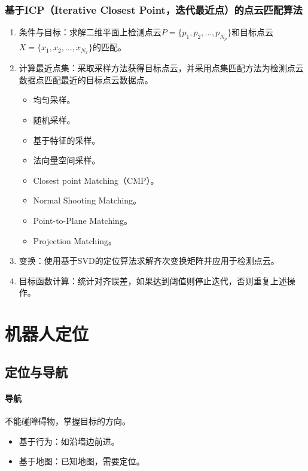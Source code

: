 \documentclass[
12pt, %
a4paper, 
oneside, %
headinclude,footinclude, %
]{scrartcl}
\begin{document}
\subsubsection[基于ICP的点云匹配算法]{基于ICP（Iterative Closest Point，迭代最近点）的点云匹配算法}
\begin{enumerate}
\item 条件与目标：求解二维平面上检测点云$ P = \{p_1, p_2, \dots, p_{N_p}\} $和目标点云$ X = \{x_1, x_2, \dots, x_{N_x}\} $的匹配。
\item 计算最近点集：采取采样方法获得目标点云，并采用点集匹配方法为检测点云数据点匹配最近的目标点云数据点。

\begin{minipage}{0.5\textwidth}
\begin{itemize}
\item 均匀采样。
\item 随机采样。
\item 基于特征的采样。
\item 法向量空间采样。
\end{itemize}
\end{minipage}
\begin{minipage}{0.5\textwidth}
\begin{itemize}
\item Closest point Matching（CMP）。
\item Normal Shooting Matching。
\item Point-to-Plane Matching。
\item Projection Matching。
\end{itemize}
\end{minipage}
\item 变换：使用基于SVD的定位算法求解齐次变换矩阵并应用于检测点云。
\item 目标函数计算：统计对齐误差，如果达到阈值则停止迭代，否则重复上述操作。
\end{enumerate}
\section{机器人定位}
\subsection[定位与导航]{定位与导航}
\paragraph{导航}
不能碰障碍物，掌握目标的方向。
\begin{itemize}
\item 基于行为：如沿墙边前进。
\item 基于地图：已知地图，需要定位。
\end{itemize}
\end{document}

